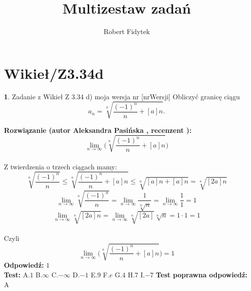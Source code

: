 \documentclass[12pt, a4paper]{article}
\title{Multizestaw zadań}
\author{Robert Fidytek}
\date{}
\theoremstyle{definition} %
\newtheorem{zad}{}
\newcommand{\kategoria}[1]{\section{#1}} %
\newcommand{\zadStart}[1]{\begin{zad}#1\newline} %
\newcommand{\zadStop}{\end{zad}}   %
\newcommand{\rozwStart}[2]{\noindent \textbf{Rozwiązanie (autor #1 , recenzent #2): }\newline} %
\newcommand{\rozwStop}{\newline}                                            %
\newcommand{\odpStart}{\noindent \textbf{Odpowiedź:}\newline}    %
\newcommand{\odpStop}{\newline}                                             %
\newcommand{\testStart}{\noindent \textbf{Test:}\newline} %
\newcommand{\testStop}{\newline} %
\newcommand{\kluczStart}{\noindent \textbf{Test poprawna odpowiedź:}\newline} %
\newcommand{\kluczStop}{\newline} %
\begin{document}
\maketitle


\kategoria{Wikieł/Z3.34d}
\zadStart{Zadanie z Wikieł Z 3.34 d) moja wersja nr [nrWersji]}
Obliczyć granicę ciągu $$a_n=\sqrt[n]{\frac{(-1)^n}{n}+[a]n}.$$
\zadStop
\rozwStart{Aleksandra Pasińska}{}
$$\lim_{n\rightarrow \infty}\biggl(\sqrt[n]{\frac{(-1)^n}{n}+[a]n}\biggr)$$\\
Z twierdzenia o trzech ciągach mamy:
$$\sqrt[n]{\frac{(-1)^n}{n}}\leqslant \sqrt[n]{\frac{(-1)^n}{n}+[a]n} \leqslant \sqrt[n]{[a]n+[a]n}= \sqrt[n]{[2a]n}$$
$$\lim_{n\rightarrow \infty}\sqrt[n]{\frac{(-1)^n}{n}}=\lim_{n\rightarrow \infty}\frac{1}{\sqrt[n]{n}}=\lim_{n\rightarrow \infty}\frac{1}{1}=1$$
$$\lim_{n\rightarrow \infty}\sqrt[n]{[2a]n}=\lim_{n\rightarrow \infty}\sqrt[n]{[2a]}\sqrt[n]{n}=1\cdot 1=1$$\\
Czyli $$\lim_{n\rightarrow \infty}\biggl(\sqrt[n]{\frac{(-1)^n}{n}+[a]n}\biggr)=1$$
\rozwStop
\odpStart
$1$\\
\odpStop
\testStart
A.$1$
B.$\infty$
C.$-\infty$
D.$-1$
E.$9$
F.$e$
G.$4$
H.$7$
I.$-7$
\testStop
\kluczStart
A
\kluczStop
\end{document}
